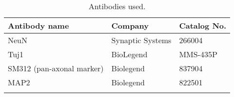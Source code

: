 \clearpage
\begin{longtable}{p{5cm} p{5cm} p{5cm}}
    \caption{Antibodies used.}
    \hline
    \textbf{Antibody name}                & \textbf{Company}      & \textbf{Catalog No.} \\
    \hline
    \hline
    NeuN                                  & Synaptic Systems      & 266004               \\
    \hline
    Tuj1                                  & BioLegend             & MMS-435P             \\
    \hline
    SM312 (pan-axonal marker)             & Biolegend             & 837904               \\
    \hline
    MAP2                                  & Biolegend             & 822501               \\
    \hline
    \label{tab:antibodies_used}
\end{longtable}

    
    